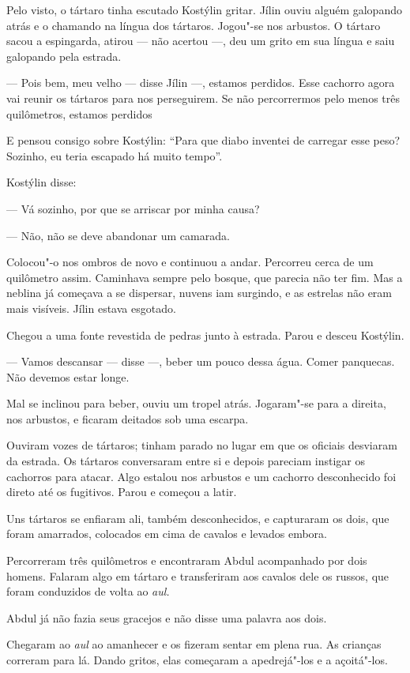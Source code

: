 Pelo visto, o tártaro tinha escutado Kostýlin gritar. Jílin ouviu alguém
galopando atrás e o chamando na língua dos tártaros. Jogou"-se nos
arbustos. O tártaro sacou a espingarda, atirou --- não acertou ---, deu
um grito em sua língua e saiu galopando pela estrada.

--- Pois bem, meu velho --- disse Jílin ---, estamos perdidos. Esse
cachorro agora vai reunir os tártaros para nos perseguirem. Se não
percorrermos pelo menos três quilômetros, estamos perdidos

E pensou consigo sobre Kostýlin: ``Para que diabo inventei de carregar
esse peso? Sozinho, eu teria escapado há muito tempo''.

Kostýlin disse:

--- Vá sozinho, por que se arriscar por minha causa?

--- Não, não se deve abandonar um camarada.

Colocou"-o nos ombros de novo e continuou a andar. Percorreu cerca de um
quilômetro assim. Caminhava sempre pelo bosque, que parecia não ter fim.
Mas a neblina já começava a se dispersar, nuvens iam surgindo, e as
estrelas não eram mais visíveis. Jílin estava esgotado.

Chegou a uma fonte revestida de pedras junto à estrada. Parou e desceu
Kostýlin.

--- Vamos descansar --- disse ---, beber um pouco dessa água. Comer
panquecas. Não devemos estar longe.

Mal se inclinou para beber, ouviu um tropel atrás. Jogaram"-se para a
direita, nos arbustos, e ficaram deitados sob uma escarpa.

Ouviram vozes de tártaros; tinham parado no lugar em que os oficiais
desviaram da estrada. Os tártaros conversaram entre si e depois pareciam
instigar os cachorros para atacar. Algo estalou nos arbustos e um
cachorro desconhecido foi direto até os fugitivos. Parou e começou a
latir.

Uns tártaros se enfiaram ali, também desconhecidos, e capturaram os
dois, que foram amarrados, colocados em cima de cavalos e levados
embora.

Percorreram três quilômetros e encontraram Abdul acompanhado por dois
homens. Falaram algo em tártaro e transferiram aos cavalos dele os
russos, que foram conduzidos de volta ao \emph{aul.}

Abdul já não fazia seus gracejos e não disse uma palavra aos dois.

Chegaram ao \emph{aul} ao amanhecer e os fizeram sentar em plena rua. As
crianças correram para lá. Dando gritos, elas começaram a apedrejá"-los e
a açoitá"-los.


